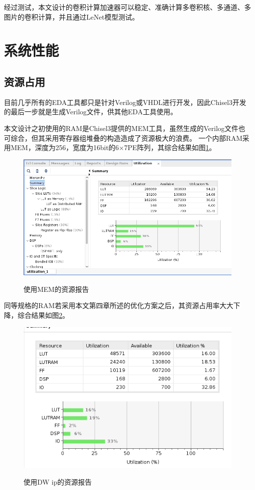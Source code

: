     经过测试，本文设计的卷积计算加速器可以稳定、准确计算多卷积核、多通道、多图片的卷积计算，并且通过LeNet模型测试。

\section{系统性能}
    \subsection{资源占用}
    目前几乎所有的EDA工具都只是针对Verilog或VHDL进行开发，因此Chisel3开发的最后一步就是生成Verilog文件，供其他EDA工具使用。

    本文设计之初使用的RAM是Chisel3提供的MEM工具，虽然生成的Verilog文件也可综合，但其采用寄存器组堆叠的构造造成了资源极大的浪费。
    一个内部RAM采用MEM，深度为256，宽度为16bit的6×7PE阵列，其综合结果如图\ref{mem_res}。
    \begin{figure}[h]
        \centering
        \includegraphics[scale=0.5]{../pdf/old_resource.png}\\
        \caption{使用MEM的资源报告}
        \label{mem_res}
    \end{figure}
    同等规格的RAM若采用本文第四章所述的优化方案之后，其资源占用率大大下降，综合结果如图\ref{dw_res}。
    \begin{figure}[h]
        \centering
        \includegraphics[scale=0.5]{../pdf/new_resource.png}\\
        \caption{使用DW ip的资源报告}
        \label{dw_res}
    \end{figure}

